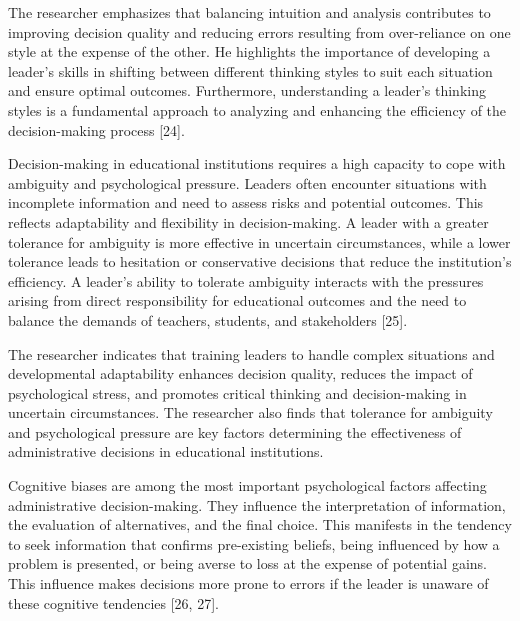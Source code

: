 \documentclass[10pt]{NSP1}
\begin{document}
The researcher emphasizes that balancing intuition and analysis contributes to improving decision quality and reducing errors resulting from over-reliance on one style at the expense of the other. He highlights the importance of developing a leader's skills in shifting between different thinking styles to suit each situation and ensure optimal outcomes. Furthermore, understanding a leader's thinking styles is a fundamental approach to analyzing and enhancing the efficiency of the decision-making process [24].

\par\medskip{}\smallskip

Decision-making in educational institutions requires a high capacity to cope with ambiguity and psychological pressure. Leaders often encounter situations with incomplete information and need to assess risks and potential outcomes. This reflects adaptability and flexibility in decision-making. A leader with a greater tolerance for ambiguity is more effective in uncertain circumstances, while a lower tolerance leads to hesitation or conservative decisions that reduce the institution's efficiency. A leader's ability to tolerate ambiguity interacts with the pressures arising from direct responsibility for educational outcomes and the need to balance the demands of teachers, students, and stakeholders [25].

The researcher indicates that training leaders to handle complex situations and developmental adaptability enhances decision quality, reduces the impact of psychological stress, and promotes critical thinking and decision-making in uncertain circumstances. The researcher also finds that tolerance for ambiguity and psychological pressure are key factors determining the effectiveness of administrative decisions in educational institutions.

\par\medskip{}\smallskip

Cognitive biases are among the most important psychological factors affecting administrative decision-making. They influence the interpretation of information, the evaluation of alternatives, and the final choice. This manifests in the tendency to seek information that confirms pre-existing beliefs, being influenced by how a problem is presented, or being averse to loss at the expense of potential gains. This influence makes decisions more prone to errors if the leader is unaware of these cognitive tendencies [26, 27].
\end{document}

